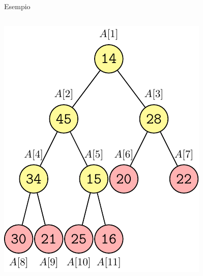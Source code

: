 \begin{frame}{Esempio}
\begin{columns}[T]
\begin{overprint}
\includegraphics[width=\textwidth,page=10]{heapbuild.pdf}
\end{overprint}
\end{columns}

\end{frame}

